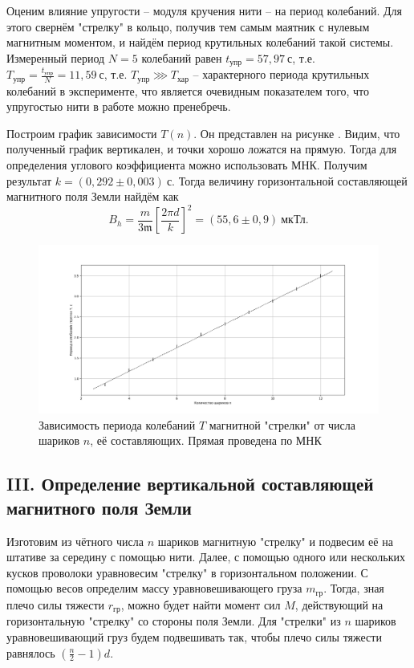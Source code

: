 \documentclass[a4paper,10pt]{article}
\begin{document}
Оценим влияние упругости -- модуля кручения нити -- на период колебаний. Для этого свернём "стрелку" в кольцо, получив тем самым маятник с нулевым магнитным моментом, и найдём период крутильных колебаний такой системы. Измеренный период $N=5$ колебаний равен $t_{\text{упр}}=57,97~\text{с}$, т.е. $T_{\text{упр}}=\frac{t_{\text{упр}}}{N}=11,59~\text{с}$, т.е. $T_{\text{упр}}\ggg T_{\text{хар}}$ -- характерного периода крутильных колебаний в эксперименте, что является очевидным показателем того, что упругостью нити в работе можно пренебречь.

Построим график зависимости $T(n)$. Он представлен на рисунке . Видим, что полученный график вертикален, и точки хорошо ложатся на прямую. Тогда для определения углового коэффициента можно использовать МНК. Получим результат $k=\left(0,292\pm0,003\right)~\text{с}$. Тогда величину горизонтальной составляющей магнитного поля Земли найдём как\[B_h=\frac{m}{3\mathfrak{m}}\left[\frac{2\pi d}{k}\right]^2=\left(55,6\pm0,9\right)~\text{мкТл}.\]

\begin{figure}[h]
	\centering
	\includegraphics[scale = 0.33]{plot}
	\caption{Зависимость периода колебаний $T$ магнитной "стрелки" от числа шариков $n$, её составляющих. Прямая проведена по МНК} \label{plot}
\end{figure} 

\subsection*{III. Определение вертикальной составляющей магнитного поля Земли}

Изготовим из чётного числа $n$ шариков магнитную "стрелку" и подвесим её на штативе за середину с помощью нити. Далее, с помощью одного или нескольких кусков проволоки уравновесим "стрелку" в горизонтальном положении. С помощью весов определим массу уравновешивающего груза $m_{\text{гр}}$. Тогда, зная плечо силы тяжести $r_{\text{гр}}$, можно будет найти момент сил $M$, действующий на горизонтальную "стрелку" со стороны поля Земли. Для "стрелки" из $n$ шариков уравновешивающий груз будем подвешивать так, чтобы плечо силы тяжести равнялось $\left(\frac{n}{2}-1\right)d$.
\end{document}

